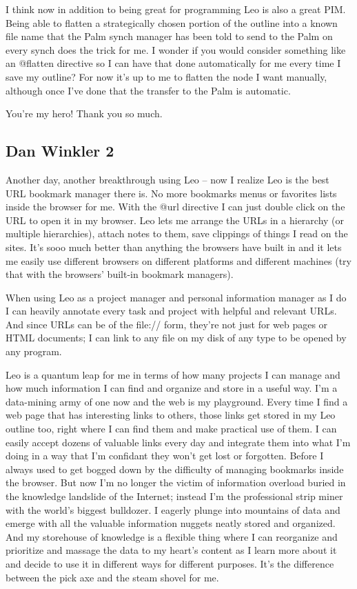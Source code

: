 \documentclass[a4paper,10pt,english]{sphinxmanual}
\begin{document}
I think now in addition to being great for programming Leo is also a great PIM.
Being able to flatten a strategically chosen portion of the outline into a known
file name that the Palm synch manager has been told to send to the Palm on every
synch does the trick for me. I wonder if you would consider something like an
@flatten directive so I can have that done automatically for me every time I
save my outline? For now it's up to me to flatten the node I want manually,
although once I've done that the transfer to the Palm is automatic.

You're my hero! Thank you so much.


\subsection{Dan Winkler 2}
\label{testimonials:dan-winkler-2}
Another day, another breakthrough using Leo -- now I realize Leo is the
best URL bookmark manager there is.  No more bookmarks menus or
favorites lists inside the browser for me.  With the @url directive I
can just double click on the URL to open it in my browser.  Leo lets me
arrange the URLs in a hierarchy (or multiple hierarchies), attach notes
to them, save clippings of things I read on the sites.  It's sooo much
better than anything the browsers have built in and it lets me easily
use different browsers on different platforms and different machines
(try that with the browsers' built-in bookmark managers).

When using Leo as a project manager and personal information manager as
I do I can heavily annotate every task and project with helpful and
relevant URLs.  And since URLs can be of the file:// form, they're not
just for web pages or HTML documents;  I can link to any file on my disk
of any type to be opened by any program.

Leo is a quantum leap for me in terms of how many projects I can manage
and how much information I can find and organize and store in a useful
way.  I'm a data-mining army of one now and the web is my playground.
Every time I find a web page that has interesting links to others,
those links get stored in my Leo outline too, right where I can find
them and make practical use of them.  I can easily accept dozens of
valuable links every day and integrate them into what I'm doing in a way
that I'm confidant they won't get lost or forgotten.  Before I always
used to get bogged down by the difficulty of managing bookmarks inside
the browser.  But now I'm no longer the victim of information overload
buried in the knowledge landslide of the Internet;  instead I'm the
professional strip miner with the world's biggest bulldozer.  I eagerly
plunge into mountains of data and emerge with all the valuable
information nuggets neatly stored and organized.  And my storehouse of
knowledge is a flexible thing where I can reorganize and prioritize and
massage the data to my heart's content as I learn more about it and
decide to use it in different ways for different purposes.  It's the
difference between the pick axe and the steam shovel for me.
\end{document}
